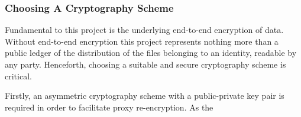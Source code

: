 \subsubsection{Choosing A Cryptography Scheme}

Fundamental to this project is the underlying end-to-end encryption of data. Without end-to-end encryption this project represents nothing more than a public ledger of the distribution of the files belonging to an identity, readable by any party. Henceforth, choosing a suitable and secure cryptography scheme is critical.

Firstly, an asymmetric cryptography scheme with a public-private key pair is required in order to facilitate proxy re-encryption. As the 
